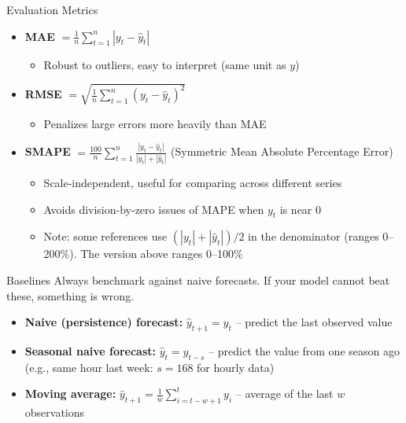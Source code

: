 \documentclass[11pt,compress,t,notes=noshow, xcolor=table]{beamer}
\begin{document}
\begin{vbframe}{Evaluation Metrics}
\vfill
  \begin{itemize}
    \item \textbf{MAE} $= \frac{1}{n}\sum_{t=1}^{n} |y_t-\hat y_t|$
    \begin{itemize}
        \item Robust to outliers, easy to interpret (same unit as $y$)
    \end{itemize}
    \item \textbf{RMSE} $= \sqrt{\frac{1}{n}\sum_{t=1}^{n}(y_t - \hat{y}_t)^2}$
    \begin{itemize}
        \item Penalizes large errors more heavily than MAE
    \end{itemize}
    \item \textbf{SMAPE} $= \frac{100}{n}\sum_{t=1}^{n}\frac{|y_t - \hat{y}_t|}{|y_t| + |\hat{y}_t|}$ (Symmetric Mean Absolute Percentage Error)
    \begin{itemize}
        \item Scale-independent, useful for comparing across different series
        \item Avoids division-by-zero issues of MAPE when $y_t$ is near 0
        \item Note: some references use $(|y_t| + |\hat{y}_t|)/2$ in the denominator (ranges 0--200\%). The version above ranges 0--100\%
    \end{itemize}
  \end{itemize}
\vfill
\end{vbframe}

\begin{vbframe}{Baselines}
\vfill
Always benchmark against naive forecasts. If your model cannot beat these, something is wrong.
\vfill
\begin{itemize}
    \item \textbf{Naive (persistence) forecast:} $\hat{y}_{t+1} = y_t$ -- predict the last observed value
    \item \textbf{Seasonal naive forecast:} $\hat{y}_{t} = y_{t-s}$ -- predict the value from one season ago (e.g., same hour last week: $s = 168$ for hourly data)
    \item \textbf{Moving average:} $\hat{y}_{t+1} = \frac{1}{w}\sum_{i=t-w+1}^{t} y_i$ -- average of the last $w$ observations
\end{itemize}
\vfill
\end{vbframe}


\end{document}
